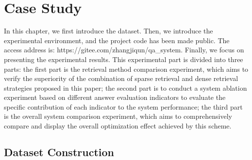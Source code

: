 
\section{Case Study}
In this chapter, we first introduce the dataset. Then, we introduce the experimental environment, and the project code has been made public. The access address is: {https://gitee.com/zhangjiqun/qa\_system}. Finally, we focus on presenting the experimental results. This experimental part is divided into three parts: the first part is the retrieval method comparison experiment, which aims to verify the superiority of the combination of sparse retrieval and dense retrieval strategies proposed in this paper; the second part is to conduct a system ablation experiment based on different answer evaluation indicators to evaluate the specific contribution of each indicator to the system performance; the third part is the overall system comparison experiment, which aims to comprehensively compare and display the overall optimization effect achieved by this scheme.
\subsection{Dataset Construction}

